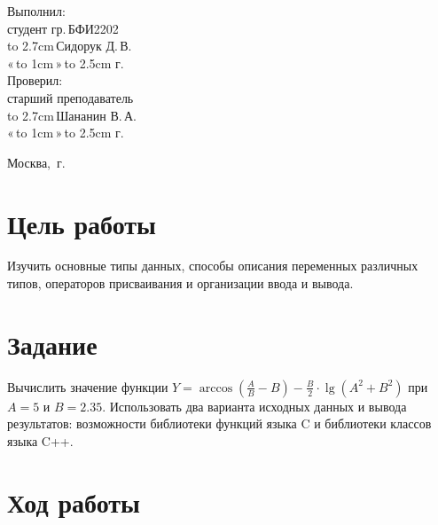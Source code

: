 \documentclass[14pt]{extarticle}
\makeatletter
\newcommand{\hrf}[1]{\hbox to #1{\hrulefill}} %
\newcounter{sectionc} %
\newcommand{\numbersections}{\renewcommand{\Hy@numberline}[1]{##1~}}
\newcommand{\nonumbersections}{\renewcommand{\Hy@numberline}[1]{}}
\let\oldsection\section
\renewcommand{\section}{\numbersections\oldsection}
\let\oldsectionc\sectionc
\renewcommand{\sectionc}{\nonumbersections\oldsectionc}
\renewcommand\tableofcontents{
	\pdfbookmark[sectionc]{\contentsname}{toc} %
	\sectionc*{\contentsname
		\@mkboth{\contentsname}{\contentsname}}
	\@starttoc{toc}
}
\makeatother
\begin{document}
\vfill %

\hfill %
\begin{minipage}{0.45\textwidth} %
	Выполнил:\\[2mm]
	студент гр.\,БФИ2202\\[2mm]
	\hrf{2.7cm}\,Сидорук Д.\,В.\\[2mm]
	«\,\hrf{1cm}\,»\,\hrf{2.5cm}\,\the\year{}\,г.\\[5mm]
	
	Проверил:\\[2mm]
	старший преподаватель\\[2mm]
	\hrf{2.7cm}\,Шананин В.\,А.\\[2mm]
	«\,\hrf{1cm}\,»\,\hrf{2.5cm}\,\the\year{}\,г.
\end{minipage}%

\vfill

\centerline{Москва, \the\year{}\,г.} %
\thispagestyle{empty} %
\newpage %
\tableofcontents %
\newpage %

\section{Цель работы}

Изучить основные типы данных, способы описания переменных различных типов, операторов присваивания и организации ввода и вывода.

\section{Задание}

Вычислить значение функции $Y = \arccos (\frac{A}{B} - B) - \frac{B}{2} \cdot \lg (A^2 + B^2)$ при $A = 5$ и $B = 2.35$. Использовать два варианта исходных данных и вывода результатов: возможности библиотеки функций языка C и библиотеки классов языка C++.

\section{Ход работы}
\end{document}
